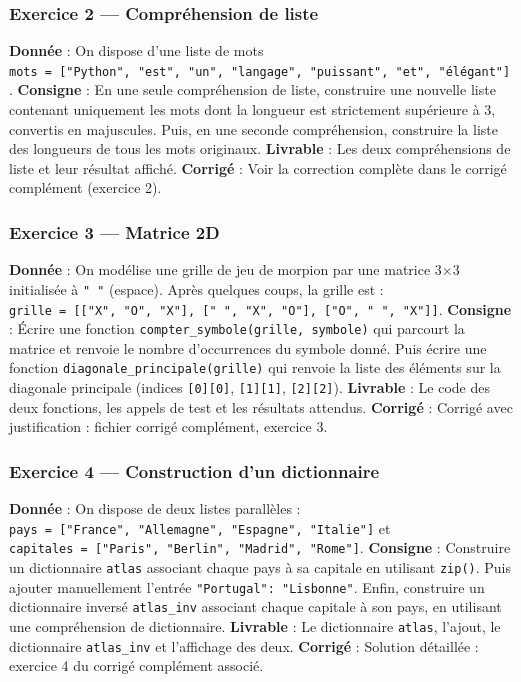 \subsubsection{Exercice 2 — Compréhension de liste}

\textbf{Donnée} : On dispose d'une liste de mots
\texttt{mots\ =\ {[}"Python",\ "est",\ "un",\ "langage",\ "puissant",\ "et",\ "élégant"{]}}.
\textbf{Consigne} : En une seule compréhension de liste, construire une
nouvelle liste contenant uniquement les mots dont la longueur est
strictement supérieure à 3, convertis en majuscules. Puis, en une
seconde compréhension, construire la liste des longueurs de tous les
mots originaux. \textbf{Livrable} : Les deux compréhensions de liste et
leur résultat affiché. \textbf{Corrigé} : Voir la correction complète
dans le corrigé complément (exercice 2).

\subsubsection{Exercice 3 — Matrice 2D}

\textbf{Donnée} : On modélise une grille de jeu de morpion par une
matrice 3×3 initialisée à \texttt{"\ "} (espace). Après quelques coups,
la grille est :
\texttt{grille\ =\ {[}{[}"X",\ "O",\ "X"{]},\ {[}"\ ",\ "X",\ "O"{]},\ {[}"O",\ "\ ",\ "X"{]}{]}}.
\textbf{Consigne} : Écrire une fonction
\texttt{compter\_symbole(grille,\ symbole)} qui parcourt la matrice et
renvoie le nombre d'occurrences du symbole donné. Puis écrire une
fonction \texttt{diagonale\_principale(grille)} qui renvoie la liste des
éléments sur la diagonale principale (indices \texttt{{[}0{]}{[}0{]}},
\texttt{{[}1{]}{[}1{]}}, \texttt{{[}2{]}{[}2{]}}). \textbf{Livrable} :
Le code des deux fonctions, les appels de test et les résultats
attendus. \textbf{Corrigé} : Corrigé avec justification : fichier
corrigé complément, exercice 3.

\subsubsection{Exercice 4 — Construction d’un dictionnaire}

\textbf{Donnée} : On dispose de deux listes parallèles :
\texttt{pays\ =\ {[}"France",\ "Allemagne",\ "Espagne",\ "Italie"{]}} et
\texttt{capitales\ =\ {[}"Paris",\ "Berlin",\ "Madrid",\ "Rome"{]}}.
\textbf{Consigne} : Construire un dictionnaire \texttt{atlas} associant
chaque pays à sa capitale en utilisant \texttt{zip()}. Puis ajouter
manuellement l'entrée \texttt{"Portugal":\ "Lisbonne"}. Enfin,
construire un dictionnaire inversé \texttt{atlas\_inv} associant chaque
capitale à son pays, en utilisant une compréhension de dictionnaire.
\textbf{Livrable} : Le dictionnaire \texttt{atlas}, l'ajout, le
dictionnaire \texttt{atlas\_inv} et l'affichage des deux.
\textbf{Corrigé} : Solution détaillée : exercice 4 du corrigé complément
associé.

